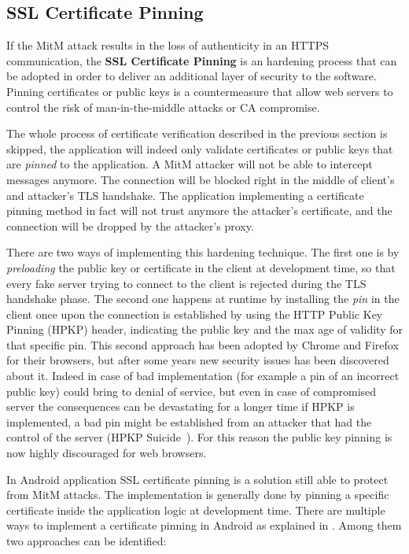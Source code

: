 		\subsection{SSL Certificate Pinning}
			\par If the MitM attack results in the loss of authenticity in an HTTPS communication, the \textbf{SSL Certificate Pinning} is an hardening process that can be adopted in order to deliver an additional layer of security to the software. Pinning certificates or public keys is a countermeasure that allow web servers to control the risk of man-in-the-middle attacks or CA compromise. 
			\par The whole process of certificate verification described in the previous section is skipped, the application will indeed only validate certificates or public keys that are \textit{pinned} to the application. A MitM attacker will not be able to intercept messages anymore. The connection will be blocked right in the middle of client's and attacker's TLS handshake. The application implementing a certificate pinning method in fact will not trust anymore the attacker's certificate, and the connection will be dropped by the attacker's proxy.
			\par There are two ways of implementing this hardening technique. The first one is by \textit{preloading} the public key or certificate in the client at development time, so that every fake server trying to connect to the client is rejected during the TLS handshake phase. The second one happens at runtime by installing the \textit{pin} in the client once upon the connection is established by using the HTTP Public Key Pinning (HPKP) header, indicating the public key and the max age of validity for that specific pin. This second approach has been adopted by Chrome and Firefox for their browsers, but after some years new security issues has been discovered about it. Indeed in case of bad implementation (for example a pin of an incorrect public key) could bring to denial of service, but even in case of compromised server the consequences can be devastating for a longer time if HPKP is implemented, a bad pin might be established from an attacker that had the control of the server (HPKP Suicide~\cite{HPKP_suicide}). For this reason the public key pinning is now highly discouraged for web browsers. \newline
			\par In Android application SSL certificate pinning is a solution still able to protect from MitM attacks. The implementation is generally done by pinning a specific certificate inside the application logic at development time. There are multiple ways to implement a certificate pinning in Android as explained in \cite{android_ssl_pinning}. Among them two approaches can be identified: 
